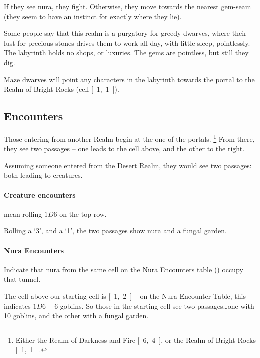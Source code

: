 \begin{multicols}{2}
If they see nura, they fight.
Otherwise, they move towards the nearest gem-seam (they seem to have an instinct for exactly where they lie).

Some people say that this realm is a purgatory for greedy dwarves, where their lust for precious stones drives them to work all day, with little sleep, pointlessly.
The labyrinth holds no shops, or luxuries.
The gems are pointless, but still they dig.

Maze dwarves will point any characters in the labyrinth towards the portal to the Realm of Bright Rocks (cell \mbox{[ 1, 1 ]}).

\boxPair{
  \umberhulk
}{
  \archmage
}

\subsection{Encounters}
\label{labyrinth}

Those entering from another Realm begin at the one of the portals.
\footnote{Either the Realm of Darkness and Fire \mbox{[ 6, 4 ]}, or the Realm of Bright Rocks \mbox{[ 1, 1 ]}.}
From there, they see two passages -- one leads to the cell above, and the other to the right.

\begin{exampletext}
  Assuming someone entered from the Desert Realm, they would see two passages: both leading to creatures.
\end{exampletext}

\paragraph{Creature encounters}
mean rolling $1D6$ on the top row.

\begin{exampletext}
  Rolling a `3', and a `1', the two passages show nura and a fungal garden.
\end{exampletext}

\jelly

\paragraph{Nura Encounters}
Indicate that nura from the same cell on the Nura Encounters table () occupy that tunnel.

\begin{exampletext}
  The cell above our starting cell is \mbox{[ 1, 2 ]} -- on the Nura Encounter Table, this indicates $1D6+6$ goblins.
  So those in the starting cell see two passages\ldots one with 10 goblins, and the other with a fungal garden.


\end{exampletext}
\end{multicols}
